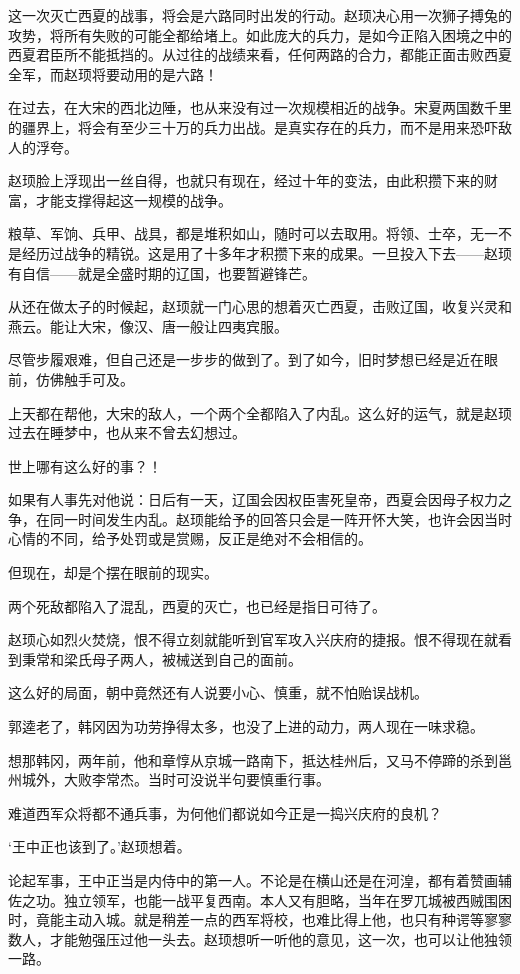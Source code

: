 这一次灭亡西夏的战事，将会是六路同时出发的行动。赵顼决心用一次狮子搏兔的攻势，将所有失败的可能全都给堵上。如此庞大的兵力，是如今正陷入困境之中的西夏君臣所不能抵挡的。从过往的战绩来看，任何两路的合力，都能正面击败西夏全军，而赵顼将要动用的是六路！

在过去，在大宋的西北边陲，也从来没有过一次规模相近的战争。宋夏两国数千里的疆界上，将会有至少三十万的兵力出战。是真实存在的兵力，而不是用来恐吓敌人的浮夸。

赵顼脸上浮现出一丝自得，也就只有现在，经过十年的变法，由此积攒下来的财富，才能支撑得起这一规模的战争。

粮草、军饷、兵甲、战具，都是堆积如山，随时可以去取用。将领、士卒，无一不是经历过战争的精锐。这是用了十多年才积攒下来的成果。一旦投入下去——赵顼有自信——就是全盛时期的辽国，也要暂避锋芒。

从还在做太子的时候起，赵顼就一门心思的想着灭亡西夏，击败辽国，收复兴灵和燕云。能让大宋，像汉、唐一般让四夷宾服。

尽管步履艰难，但自己还是一步步的做到了。到了如今，旧时梦想已经是近在眼前，仿佛触手可及。

上天都在帮他，大宋的敌人，一个两个全都陷入了内乱。这么好的运气，就是赵顼过去在睡梦中，也从来不曾去幻想过。

世上哪有这么好的事？！

如果有人事先对他说：日后有一天，辽国会因权臣害死皇帝，西夏会因母子权力之争，在同一时间发生内乱。赵顼能给予的回答只会是一阵开怀大笑，也许会因当时心情的不同，给予处罚或是赏赐，反正是绝对不会相信的。

但现在，却是个摆在眼前的现实。

两个死敌都陷入了混乱，西夏的灭亡，也已经是指日可待了。

赵顼心如烈火焚烧，恨不得立刻就能听到官军攻入兴庆府的捷报。恨不得现在就看到秉常和梁氏母子两人，被械送到自己的面前。

这么好的局面，朝中竟然还有人说要小心、慎重，就不怕贻误战机。

郭逵老了，韩冈因为功劳挣得太多，也没了上进的动力，两人现在一味求稳。

想那韩冈，两年前，他和章惇从京城一路南下，抵达桂州后，又马不停蹄的杀到邕州城外，大败李常杰。当时可没说半句要慎重行事。

难道西军众将都不通兵事，为何他们都说如今正是一捣兴庆府的良机？

‘王中正也该到了。’赵顼想着。

论起军事，王中正当是内侍中的第一人。不论是在横山还是在河湟，都有着赞画辅佐之功。独立领军，也能一战平复西南。本人又有胆略，当年在罗兀城被西贼围困时，竟能主动入城。就是稍差一点的西军将校，也难比得上他，也只有种谔等寥寥数人，才能勉强压过他一头去。赵顼想听一听他的意见，这一次，也可以让他独领一路。

